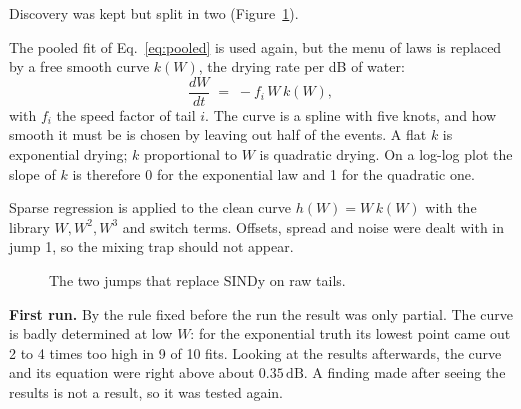 \documentclass[11pt,a4paper]{article}
\newcommand{\dB}{\,\mathrm{dB}}
\begin{document}
Discovery was kept but split in two (Figure~\ref{fig:jumps}).
\begin{description}[leftmargin=1.2cm, style=nextline]
\item[Jump 1, draw the curve.] The pooled fit of Eq.~\eqref{eq:pooled} is used again, but the menu of laws is
replaced by a free smooth curve $k(W)$, the drying rate per dB of water:
\begin{equation}
\frac{dW}{dt} \;=\; -f_{i}\,W\,k(W) ,
\label{eq:freecurve}
\end{equation}
with $f_{i}$ the speed factor of tail $i$. The curve is a spline with five knots, and how smooth it must be is chosen
by leaving out half of the events. A flat $k$ is exponential drying; $k$ proportional to $W$ is quadratic drying. On
a log-log plot the slope of $k$ is therefore 0 for the exponential law and 1 for the quadratic one.
\item[Jump 2, name it.] Sparse regression is applied to the clean curve $h(W) = W\,k(W)$ with the library
$W, W^{2}, W^{3}$ and switch terms. Offsets, spread and noise were dealt with in jump 1, so the mixing trap should not
appear.
\end{description}

\begin{figure}[H]
\centering
{}
\caption{The two jumps that replace SINDy on raw tails.}
\label{fig:jumps}
\end{figure}

\textbf{First run.} By the rule fixed before the run the result was only partial. The curve is badly determined at
low $W$: for the exponential truth its lowest point came out 2 to 4 times too high in 9 of 10 fits. Looking at the
results afterwards, the curve and its equation were right above about $0.35\dB$. A finding made after seeing the
results is not a result, so it was tested again.
\end{document}
